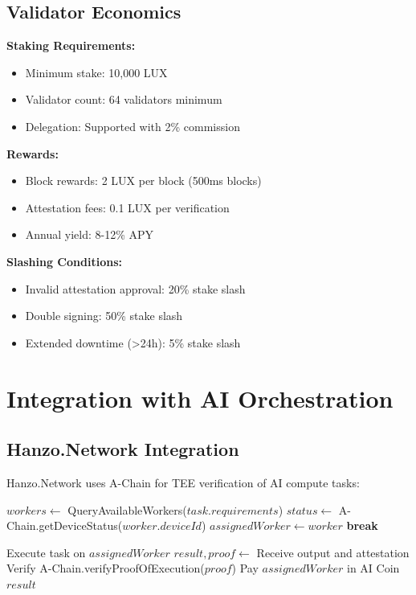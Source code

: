 \documentclass[11pt,a4paper]{article}
\begin{document}
\subsection{Validator Economics}

\textbf{Staking Requirements:}
\begin{itemize}
\item Minimum stake: 10,000 LUX
\item Validator count: 64 validators minimum
\item Delegation: Supported with 2\% commission
\end{itemize}

\textbf{Rewards:}
\begin{itemize}
\item Block rewards: 2 LUX per block (500ms blocks)
\item Attestation fees: 0.1 LUX per verification
\item Annual yield: 8-12\% APY
\end{itemize}

\textbf{Slashing Conditions:}
\begin{itemize}
\item Invalid attestation approval: 20\% stake slash
\item Double signing: 50\% stake slash
\item Extended downtime (>24h): 5\% stake slash
\end{itemize}

\section{Integration with AI Orchestration}

\subsection{Hanzo.Network Integration}

Hanzo.Network uses A-Chain for TEE verification of AI compute tasks:

\begin{algorithm}[H]
\caption{Hanzo AI Task with TEE Verification}
\begin{algorithmic}[1]
    \State $workers \gets$ QueryAvailableWorkers($task.requirements$)
        \State $status \gets$ A-Chain.getDeviceStatus($worker.deviceId$)
            \State $assignedWorker \gets worker$
            \State \textbf{break}
        \EndIf
    \EndFor
    
    \State Execute task on $assignedWorker$
    \State $result, proof \gets$ Receive output and attestation
    \State Verify A-Chain.verifyProofOfExecution($proof$)
    \State Pay $assignedWorker$ in AI Coin
    \State \Return $result$
\EndFunction
\end{algorithmic}
\end{algorithm}
\end{document}
